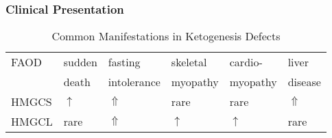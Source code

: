 \documentclass[12pt]{scrartcl}
\begin{document}
\subsubsection{Clinical Presentation}
\label{sec:org66b47f5}
\begin{table}[htbp]
\caption{\label{tab:orgb100840}Common Manifestations in Ketogenesis Defects}
\centering
\begin{tabular}{llllll}
FAOD & sudden & fasting & skeletal & cardio- & liver\\
 & death & intolerance & myopathy & myopathy & disease\\
\hline
HMGCS & \(\uparrow\) & \(\Uparrow\) & rare & rare & \(\Uparrow\)\\
HMGCL & rare & \(\Uparrow\) & \(\uparrow\) & \(\uparrow\) & rare\\
\end{tabular}
\end{table}
\end{document}
